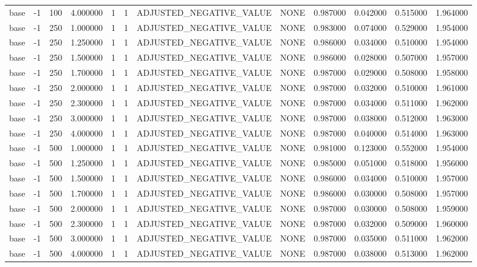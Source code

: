 \begin{tabular}{lrrrllllrrrr}
base & -1 & 100 & 4.000000 & 1 & 1 & ADJUSTED_NEGATIVE_VALUE & NONE & 0.987000 & 0.042000 & 0.515000 & 1.964000 \\
base & -1 & 250 & 1.000000 & 1 & 1 & ADJUSTED_NEGATIVE_VALUE & NONE & 0.983000 & 0.074000 & 0.529000 & 1.954000 \\
base & -1 & 250 & 1.250000 & 1 & 1 & ADJUSTED_NEGATIVE_VALUE & NONE & 0.986000 & 0.034000 & 0.510000 & 1.954000 \\
base & -1 & 250 & 1.500000 & 1 & 1 & ADJUSTED_NEGATIVE_VALUE & NONE & 0.986000 & 0.028000 & 0.507000 & 1.957000 \\
base & -1 & 250 & 1.700000 & 1 & 1 & ADJUSTED_NEGATIVE_VALUE & NONE & 0.987000 & 0.029000 & 0.508000 & 1.958000 \\
base & -1 & 250 & 2.000000 & 1 & 1 & ADJUSTED_NEGATIVE_VALUE & NONE & 0.987000 & 0.032000 & 0.510000 & 1.961000 \\
base & -1 & 250 & 2.300000 & 1 & 1 & ADJUSTED_NEGATIVE_VALUE & NONE & 0.987000 & 0.034000 & 0.511000 & 1.962000 \\
base & -1 & 250 & 3.000000 & 1 & 1 & ADJUSTED_NEGATIVE_VALUE & NONE & 0.987000 & 0.038000 & 0.512000 & 1.963000 \\
base & -1 & 250 & 4.000000 & 1 & 1 & ADJUSTED_NEGATIVE_VALUE & NONE & 0.987000 & 0.040000 & 0.514000 & 1.963000 \\
base & -1 & 500 & 1.000000 & 1 & 1 & ADJUSTED_NEGATIVE_VALUE & NONE & 0.981000 & 0.123000 & 0.552000 & 1.954000 \\
base & -1 & 500 & 1.250000 & 1 & 1 & ADJUSTED_NEGATIVE_VALUE & NONE & 0.985000 & 0.051000 & 0.518000 & 1.956000 \\
base & -1 & 500 & 1.500000 & 1 & 1 & ADJUSTED_NEGATIVE_VALUE & NONE & 0.986000 & 0.034000 & 0.510000 & 1.957000 \\
base & -1 & 500 & 1.700000 & 1 & 1 & ADJUSTED_NEGATIVE_VALUE & NONE & 0.986000 & 0.030000 & 0.508000 & 1.957000 \\
base & -1 & 500 & 2.000000 & 1 & 1 & ADJUSTED_NEGATIVE_VALUE & NONE & 0.987000 & 0.030000 & 0.508000 & 1.959000 \\
base & -1 & 500 & 2.300000 & 1 & 1 & ADJUSTED_NEGATIVE_VALUE & NONE & 0.987000 & 0.032000 & 0.509000 & 1.960000 \\
base & -1 & 500 & 3.000000 & 1 & 1 & ADJUSTED_NEGATIVE_VALUE & NONE & 0.987000 & 0.035000 & 0.511000 & 1.962000 \\
base & -1 & 500 & 4.000000 & 1 & 1 & ADJUSTED_NEGATIVE_VALUE & NONE & 0.987000 & 0.038000 & 0.513000 & 1.962000 \\

\end{tabular}
